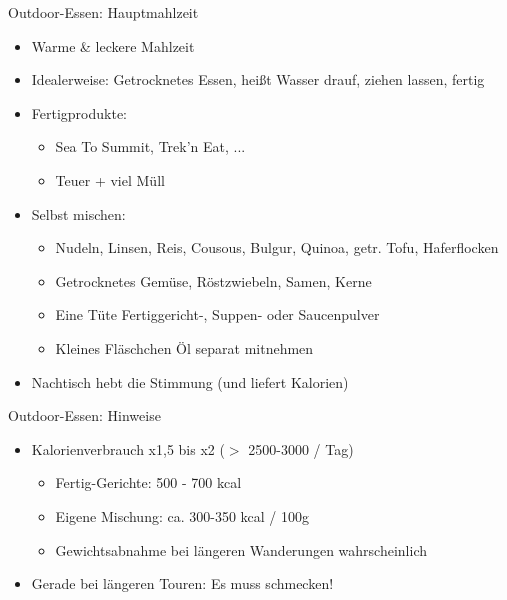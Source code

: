 \documentclass{beamer}
\begin{document}
			\begin{frame}{Outdoor-Essen: Hauptmahlzeit}
				\begin{itemize}
					\item Warme \& leckere Mahlzeit
					\item Idealerweise: Getrocknetes Essen, heißt Wasser drauf, ziehen lassen, fertig\pause
					\item Fertigprodukte:
					\begin{itemize}
						\item Sea To Summit, Trek'n Eat, ...
						\item Teuer + viel Müll
					\end{itemize}\pause
					\item Selbst mischen:
					\begin{itemize}
						\item Nudeln, Linsen, Reis, Cousous, Bulgur, Quinoa, getr. Tofu, Haferflocken
						\item Getrocknetes Gemüse, Röstzwiebeln, Samen, Kerne
						\item Eine Tüte Fertiggericht-, Suppen- oder Saucenpulver
						\item Kleines Fläschchen Öl separat mitnehmen
					\end{itemize}
					\item Nachtisch hebt die Stimmung (und liefert Kalorien)
				\end{itemize}
			\end{frame}
			
			\begin{frame}{Outdoor-Essen: Hinweise}
				\begin{itemize}
					\item Kalorienverbrauch x1,5 bis x2 ($>$ 2500-3000 / Tag)
					\begin{itemize}
						\item Fertig-Gerichte: 500 - 700 kcal
						\item Eigene Mischung: ca. 300-350 kcal / 100g
						\item Gewichtsabnahme bei längeren Wanderungen wahrscheinlich
					\end{itemize}
					\item Gerade bei längeren Touren: Es muss schmecken!
				\end{itemize}
			\end{frame}
			
\end{document}

